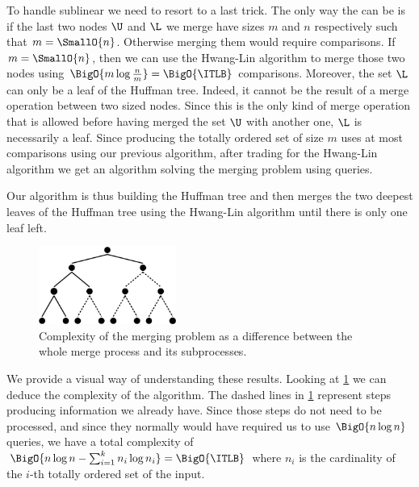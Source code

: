 To handle sublinear \concept{\ITLB} we need to resort to a last trick. The only
way the \concept{\ITLB} can be  is if the last two nodes \(\U\) and
\(\L\) we merge have sizes \(m\) and \(n\) respectively such that \(m =
\SmallO{n}\). Otherwise merging them would require  comparisons.
If \(m = \SmallO{n}\), then we can use the Hwang-Lin algorithm to merge those
two nodes using \(\BigO{m \log \frac{n}{m}} = \BigO{\ITLB}\) comparisons. Moreover, the set
\(\L\) can only be a leaf of the Huffman tree. Indeed, it cannot be the result
of a merge operation between two  sized nodes. Since this is the only
kind of merge operation that is allowed before having merged the set \(\U\)
with another one, \(\L\) is necessarily a leaf. Since producing the totally ordered
set of size \(m\) uses at most \BigO{\ITLB} comparisons using our
previous algorithm, after trading
\tapemerge for the Hwang-Lin algorithm we get an algorithm
solving the merging problem using \BigO{\ITLB} queries.

Our algorithm is thus building the Huffman tree and then merges the two deepest
leaves of the Huffman tree using the Hwang-Lin algorithm until there is only
one leaf left.

\begin{figure}
	\centering
	\includegraphics[width=0.4\textwidth]{fig/merging/huffman-2-trim}
	\caption{Complexity of the merging problem as a difference between the whole merge process and its subprocesses.}
	\label{tree:merging:fig/huffman-2}
\end{figure}

We provide a visual way of understanding these results. Looking at
\ref{tree:merging:fig/huffman-2} we can deduce the complexity of the algorithm.
The dashed lines in \ref{tree:merging:fig/huffman-2} represent steps producing
information we already have. Since those steps do not need to be processed, and
since they normally would have required us to use \(\BigO{n \log n}\) queries, we have a
total complexity of $\BigO{n \log n - \sum_{i=1}^{k} n_i \log n_i} =
\BigO{\ITLB}$ where $n_i$ is the cardinality of the $i$-th totally ordered set
of the input.
